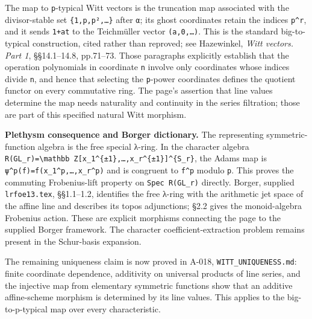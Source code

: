 \documentclass[
  10pt,
]{article}
\begin{document}
The map to \texttt{\small p}-typical Witt vectors is the truncation map
associated with the divisor-stable set
\texttt{\small \{1,\allowbreak{}p,\allowbreak{}p²,\allowbreak{}…\}}
after \texttt{\small α}; its ghost coordinates retain the indices
\texttt{\small p\textasciicircum{}r}, and it sends
\texttt{\small 1+\allowbreak{}at} to the Teichmüller vector
\texttt{\small (\allowbreak{}a,\allowbreak{}0,\allowbreak{}…)\allowbreak{}}.
This is the standard big-to-typical construction, cited rather than
reproved; see Hazewinkel, \emph{Witt vectors. Part 1}, §§14.1--14.8,
pp.71--73. Those paragraphs explicitly establish that the operation
polynomials in coordinate \texttt{\small n} involve only coordinates
whose indices divide \texttt{\small n}, and hence that selecting the
\texttt{\small p}-power coordinates defines the quotient functor on
every commutative ring. The page's assertion that line values determine
the map needs naturality and continuity in the series filtration; those
are part of this specified natural Witt morphism.

\textbf{Plethysm consequence and Borger dictionary.} The representing
symmetric-function algebra is the free special λ-ring. In the character
algebra
\texttt{\small R(\allowbreak{}GL\_\allowbreak{}r)\allowbreak{}=\allowbreak{}\textbackslash{}mathbb Z[\allowbreak{}x\_\allowbreak{}1\textasciicircum{}\{±1\},\allowbreak{}…,\allowbreak{}x\_\allowbreak{}r\textasciicircum{}\{±1\}]\allowbreak{}\textasciicircum{}\{S\_\allowbreak{}r\}},
the Adams map is
\texttt{\small ψ\textasciicircum{}p(\allowbreak{}f)\allowbreak{}=\allowbreak{}f(\allowbreak{}x\_\allowbreak{}1\textasciicircum{}p,\allowbreak{}…,\allowbreak{}x\_\allowbreak{}r\textasciicircum{}p)\allowbreak{}}
and is congruent to \texttt{\small f\textasciicircum{}p} modulo
\texttt{\small p}. This proves the commuting Frobenius-lift property on
\texttt{\small Spec R(\allowbreak{}GL\_\allowbreak{}r)\allowbreak{}}
directly. Borger, supplied \texttt{\small lrfoe13.tex}, §§1.1--1.2,
identifies the free λ-ring with the arithmetic jet space of the affine
line and describes its topos adjunctions; §2.2 gives the monoid-algebra
Frobenius action. These are explicit morphisms connecting the page to
the supplied Borger framework. The character coefficient-extraction
problem remains present in the Schur-basis expansion.

The remaining uniqueness claim is now proved in A-018,
\texttt{\small WITT\_\allowbreak{}UNIQUENESS.md}: finite coordinate
dependence, additivity on universal products of line series, and the
injective map from elementary symmetric functions show that an additive
affine-scheme morphism is determined by its line values. This applies to
the big-to-p-typical map over every characteristic.
\end{document}
